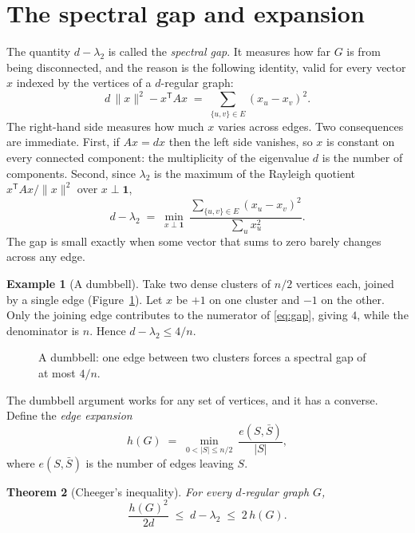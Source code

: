 \documentclass[11pt,letterpaper]{article}
\newtheorem{theorem}{Theorem}
\theoremstyle{definition}
\newtheorem{example}[theorem]{Example}
\theoremstyle{remark}
\newcommand{\one}{\mathbf{1}}
\begin{document}
\section{The spectral gap and expansion}

The quantity $d-\lambda_2$ is called the \emph{spectral gap}. It measures how far $G$ is from
being disconnected, and the reason is the following identity, valid for every vector $x$ indexed
by the vertices of a $d$-regular graph:
\begin{equation}\label{eq:dirichlet}
  d\,\lVert x\rVert^2-x^{\mathsf T}Ax\;=\;\sum_{\{u,v\}\in E}(x_u-x_v)^2 .
\end{equation}
The right-hand side measures how much $x$ varies across edges. Two consequences are immediate.
First, if $Ax=dx$ then the left side vanishes, so $x$ is constant on every connected component:
the multiplicity of the eigenvalue $d$ is the number of components. Second, since $\lambda_2$ is
the maximum of the Rayleigh quotient $x^{\mathsf T}Ax/\lVert x\rVert^2$ over $x\perp\one$,
\begin{equation}\label{eq:gap}
  d-\lambda_2\;=\;\min_{x\perp\one}\ \frac{\sum_{\{u,v\}\in E}(x_u-x_v)^2}{\sum_u x_u^2}.
\end{equation}
The gap is small exactly when some vector that sums to zero barely changes across any edge.

\begin{example}[A dumbbell]
Take two dense clusters of $n/2$ vertices each, joined by a single edge
(Figure~\ref{fig:dumbbell}). Let $x$ be $+1$ on one cluster and $-1$ on the other. Only the
joining edge contributes to the numerator of \eqref{eq:gap}, giving $4$, while the denominator is
$n$. Hence $d-\lambda_2\le 4/n$.
\end{example}

\begin{figure}[ht]
  \centering
  
  \caption{A dumbbell: one edge between two clusters forces a spectral gap of at most $4/n$.}
  \label{fig:dumbbell}
\end{figure}

The dumbbell argument works for any set of vertices, and it has a converse. Define the
\emph{edge expansion}
\[
  h(G)\;=\;\min_{0<|S|\le n/2}\ \frac{e(S,\bar S)}{|S|},
\]
where $e(S,\bar S)$ is the number of edges leaving $S$.

\begin{theorem}[Cheeger's inequality]\label{thm:cheeger}
For every $d$-regular graph $G$,
\[
  \frac{h(G)^2}{2d}\;\le\;d-\lambda_2\;\le\;2\,h(G).
\]
\end{theorem}
\end{document}
